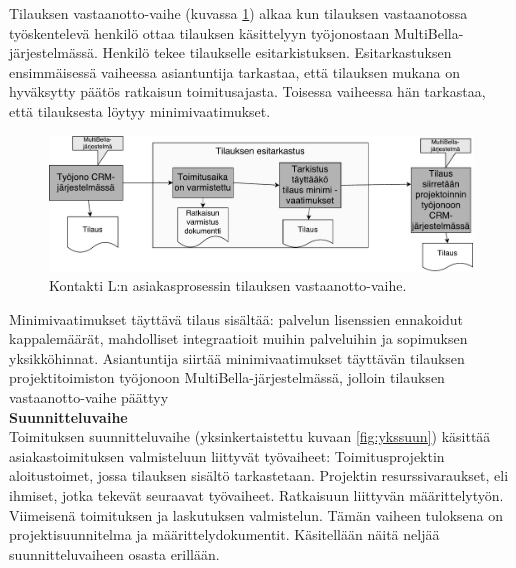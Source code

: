 \documentclass[finnish,12pt,a4paper,pdftex]{article}
\begin{document}

\noindent Tilauksen vastaanotto-vaihe (kuvassa \ref{fig:tilausvast}) alkaa kun tilauksen vastaanotossa työskentelevä henkilö ottaa tilauksen käsittelyyn työjonostaan MultiBella-järjestelmässä. Henkilö tekee tilaukselle esitarkistuksen. Esitarkastuksen ensimmäisessä vaiheessa asiantuntija tarkastaa, että tilauksen mukana on hyväksytty päätös ratkaisun toimitusajasta. Toisessa vaiheessa hän tarkastaa, että tilauksesta löytyy minimivaatimukset.\\

\begin{figure}[!h]
    \centering
    \includegraphics[scale=0.4]{images/tilvast.pdf}
    \caption{Kontakti L:n asiakasprosessin tilauksen vastaanotto-vaihe.}
    \label{fig:tilausvast}
\end{figure}

\noindent Minimivaatimukset täyttävä tilaus sisältää: palvelun lisenssien ennakoidut kappalemäärät, mahdolliset integraatioit muihin palveluihin ja sopimuksen yksikköhinnat. Asiantuntija siirtää minimivaatimukset täyttävän tilauksen projektitoimiston työjonoon MultiBella-järjestelmässä, jolloin tilauksen vastaanotto-vaihe päättyy\\

\textbf{Suunnitteluvaihe}\\


\noindent Toimituksen suunnitteluvaihe (yksinkertaistettu kuvaan \ref{fig:ykssuun}) käsittää asiakastoimituksen valmisteluun liittyvät työvaiheet: Toimitusprojektin aloitustoimet, jossa tilauksen sisältö tarkastetaan. Projektin resurssivaraukset, eli ihmiset, jotka tekevät seuraavat työvaiheet. Ratkaisuun liittyvän määrittelytyön. Viimeisenä toimituksen ja laskutuksen valmistelun. Tämän vaiheen tuloksena on projektisuunnitelma ja määrittelydokumentit. Käsitellään näitä neljää suunnitteluvaiheen osasta erillään.\\
\end{document}
